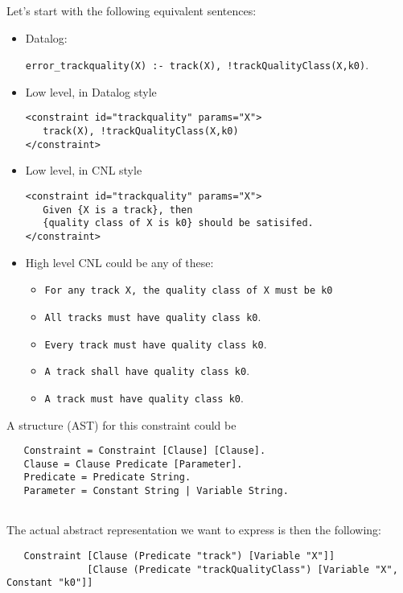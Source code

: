 \documentclass[]{article}
\providecommand{\tightlist}{%
  \setlength{\itemsep}{0pt}\setlength{\parskip}{0pt}}
\begin{document}
Let's start with the following equivalent sentences:

\begin{itemize}
\item
  Datalog:

  \texttt{error\_trackquality(X)\ :-\ track(X),\ !trackQualityClass(X,k0)}.
\item
  Low level, in Datalog style

\begin{verbatim}
<constraint id="trackquality" params="X">
   track(X), !trackQualityClass(X,k0)
</constraint>
\end{verbatim}
\item
  Low level, in CNL style

\begin{verbatim}
<constraint id="trackquality" params="X">
   Given {X is a track}, then
   {quality class of X is k0} should be satisifed.
</constraint>
\end{verbatim}
\item
  High level CNL could be any of these:

  \begin{itemize}
  \tightlist
  \item
    \texttt{For\ any\ track\ X,\ the\ quality\ class\ of\ X\ must\ be\ k0}
  \item
    \texttt{All\ tracks\ must\ have\ quality\ class\ k0}.
  \item
    \texttt{Every\ track\ must\ have\ quality\ class\ k0}.
  \item
    \texttt{A\ track\ shall\ have\ quality\ class\ k0}.
  \item
    \texttt{A\ track\ must\ have\ quality\ class\ k0}.
  \end{itemize}
\end{itemize}

A structure (AST) for this constraint could be

\begin{verbatim}
   Constraint = Constraint [Clause] [Clause].
   Clause = Clause Predicate [Parameter].
   Predicate = Predicate String.
   Parameter = Constant String | Variable String.
   
\end{verbatim}

The actual abstract representation we want to express is then the
following:

\begin{verbatim}
   Constraint [Clause (Predicate "track") [Variable "X"]] 
              [Clause (Predicate "trackQualityClass") [Variable "X", Constant "k0"]]
\end{verbatim}
\end{document}
